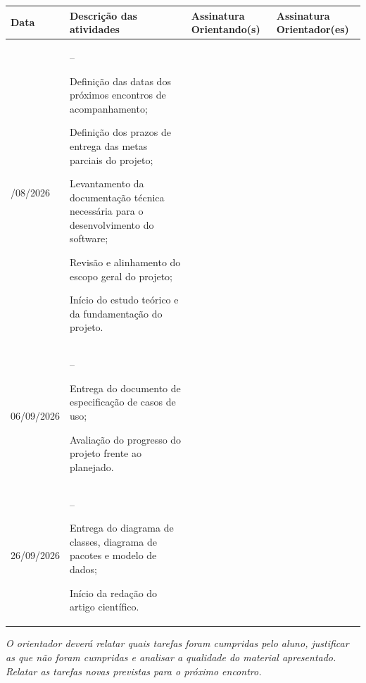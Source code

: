 \documentclass[12pt,a4paper]{article}
\newenvironment{listacompacta}{%
  \begin{list}{--}{\setlength{\leftmargin}{10pt}\setlength{\itemsep}{0pt}%
  \setlength{\parsep}{0pt}\setlength{\topsep}{0pt}\setlength{\partopsep}{0pt}}
}{\end{list}}
\begin{document}
\renewcommand{\arraystretch}{1.3}
\begin{longtable}{|>{\centering\arraybackslash}m{2.0cm}|m{7.0cm}|>{\centering\arraybackslash}m{2.4cm}|>{\centering\arraybackslash}m{2.4cm}|}
\hline
\textbf{Data} & {\centering\textbf{Descrição das atividades}\par} & \textbf{Assinatura Orientando(s)} & \textbf{Assinatura Orientador(es)} \\
\hline
\endhead

19/08/2026 &
\begin{listacompacta}
  \item Definição das datas dos próximos encontros de acompanhamento;
  \item Definição dos prazos de entrega das metas parciais do projeto;
  \item Levantamento da documentação técnica necessária para o desenvolvimento do software;
  \item Revisão e alinhamento do escopo geral do projeto;
  \item Início do estudo teórico e da fundamentação do projeto.
\end{listacompacta} & & \\
\hline

06/09/2026 &
\begin{listacompacta}
  \item Entrega do documento de especificação de casos de uso;
  \item Avaliação do progresso do projeto frente ao planejado.
\end{listacompacta} & & \\
\hline

26/09/2026 &
\begin{listacompacta}
  \item Entrega do diagrama de classes, diagrama de pacotes e modelo de dados;
  \item Início da redação do artigo científico.
\end{listacompacta} & & \\
\hline

\end{longtable}

\vspace{6pt}
{\small\itshape *O orientador deverá relatar quais tarefas foram cumpridas pelo aluno, justificar as
que não foram cumpridas e analisar a qualidade do material apresentado. Relatar as tarefas novas
previstas para o próximo encontro.\par}
\end{document}
